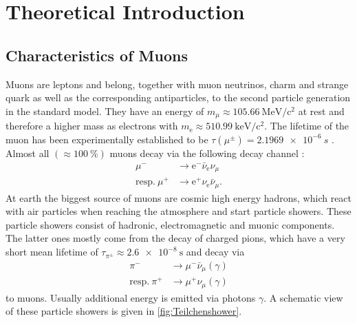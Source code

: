 
\chapter{Theoretical Introduction}
\label{cha:Theorie}

\section{Characteristics of Muons}

Muons are leptons and belong, together with muon neutrinos, charm and strange quark as well as the corresponding antiparticles, to the second particle generation in the standard model.
They have an energy of $m_{\mu} \approx \qty{105.66}{\mega\electronvolt}/\mathrm{c}^2$\cite{PDG} at rest and therefore a higher mass as electrons with $m_{\mathrm{e}} 
\approx \qty{510.99}{\kilo\electronvolt}/\mathrm{c}^2$\cite{PDG}. The lifetime of the muon has been experimentally established to be $\tau(\mu^{\pm}) = \qty{2.1969e-6}{s} $ \cite{PDG}.\\
Almost all  $(\approx \qty{100}{\percent})$ muons decay via the following decay channel \cite{PDG}:
\begin{align}
    \mu^{-} &\rightarrow \mathrm{e}^{-} \bar{\nu}_{\mathrm{e}}\nu_{\mu} \\
    \mathrm{resp.} \ \mu^{+} &\rightarrow \mathrm{e}^{+}\nu_{\mathrm{e}} \bar{\nu}_{\mu}.
\end{align}
At earth the biggest source of muons are cosmic high energy hadrons, which react with air particles when reaching the atmosphere and start particle showers.
These particle showers consist of hadronic, electromagnetic and muonic components. The latter ones mostly come from the decay of charged pions, which have a
very short mean lifetime of $\tau_{\pi^{\pm}} \approx \qty{2.6e-8}{\second}$\cite{PDG} and decay via
\begin{align}
    \pi^{-} &\rightarrow \mu^{-} \bar{\nu}_{\mu} (\gamma)\\
    \mathrm{resp.} \ \pi^{+} &\rightarrow \mu^{+} {\nu}_{\mu} (\gamma)
\end{align}
to muons. Usually additional energy is emitted via photons $\gamma$. A schematic view of these particle showers is given in \autoref{fig:Teilchenshower}.\\

